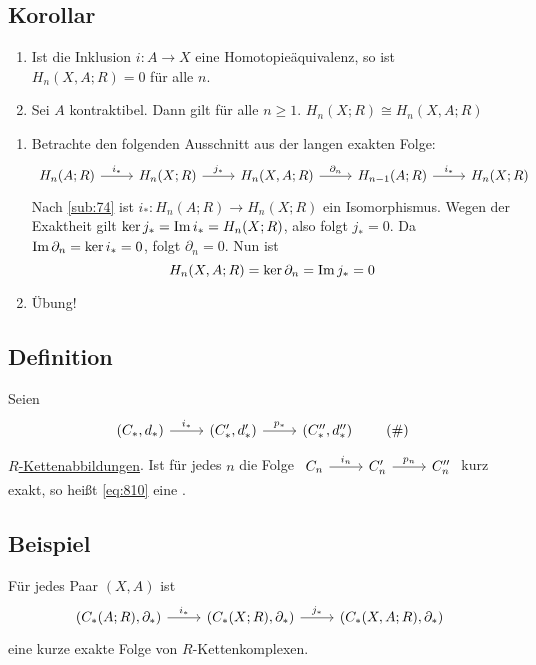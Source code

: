 \subsection[Korollar: Hologiemodul wenn $A$ kontraktibel ist]{Korollar} %
\label{sub:89}
\begin{enumerate}[(1)]
	\item Ist die Inklusion $i \colon A \to X$ eine Homotopieäquivalenz, so ist $H_n(X,A;R)= 0$ für alle $n$.
	\item Sei $A$ kontraktibel. Dann gilt für alle $n \ge 1$. $H_n(X;R) \cong H_n(X,A;R)$
\end{enumerate}
\begin{enumerate}[(1)]
	\item Betrachte den folgenden Ausschnitt aus der langen exakten Folge:
	\[
		\begin{tikzcd}
			H_n(A;R) \rar["i_*"] & H_n(X;R) \rar["j_*"] & H_n(X,A;R) \rar["\partial_n"] & H_{n-1}(A;R) \rar["i_*"] & H_n(X;R)
		\end{tikzcd}
	\]
	Nach \ref{sub:74} ist $i_* : H_n(A;R) \to H_n(X;R)$ ein Isomorphismus. Wegen der Exaktheit gilt
	$\ker j_* = \operatorname{Im} i_* = H_n(X;R)$, also folgt $j_* = 0$. Da $\operatorname{Im} \partial_n = \ker i_* = 0$, folgt $\partial_n=0$. Nun ist 
	\[
		H_n(X,A;R) = \ker \partial_n = \operatorname{Im} j_* = 0
	\]
	\item Übung! \bewende
\end{enumerate}

\subsection[Definition: Kurze exakte Folge von Kettenkomplexen]{Definition} %
\label{sub:810}
Seien 
\begin{equation*}
	\begin{tikzcd}
		(C_*,d_*) \rar["i_*"] & (C_*',d_*') \rar["p_*"] & (C_*'',d_*'') 
	\end{tikzcd} \label{eq:810}\tag{\#}
\end{equation*}
\hyperref[sub:61]{$R$-Kettenabbildungen}. Ist für jedes $n$ die Folge
\(
	\begin{tikzcd}
		C_n \rar["i_n"] & C_n' \rar["p_n"] & C_n''
	\end{tikzcd}
\)
kurz exakt, so heißt \eqref{eq:810} eine .

\subsection[Beispiel einer kurzen exakten Folge von Kettenkomplexen]{Beispiel} %
\label{sub:811}
Für jedes Paar $(X,A)$ ist 
\[
	\begin{tikzcd}
		\enbrace*{C_*(A;R),\partial_*} \rar["i_*"] & \enbrace*{C_*(X;R),\partial_*} \rar["j_*"] & \enbrace*{C_*(X,A;R),\partial_*}   
	\end{tikzcd}
\]
eine kurze exakte Folge von $R$-Kettenkomplexen.

